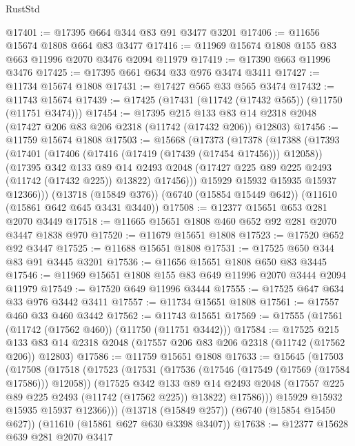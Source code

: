 \begin{lexlean}{RustStd}
\begin{coremodule}
@17401 := @17395 @664 @344 @83 @91 @3477 @3201
@17406 := @11656 @15674 @1808 @664 @83 @3477
@17416 := @11969 @15674 @1808 @155 @83 @663 @11996 @2070 @3476 @2094 @11979
@17419 := @17390 @663 @11996 @3476
@17425 := @17395 @661 @634 @33 @976 @3474 @3411
@17427 := @11734 @15674 @1808
@17431 := @17427 @565 @33 @565 @3474
@17432 := @11743 @15674
@17439 := @17425 (@17431 (@11742 (@17432 @565)) (@11750 (@11751 @3474)))
@17454 := @17395
    @215
    @133
    @83
    @14
    @2318
    @2048
    (@17427 @206 @83 @206 @2318 (@11742 (@17432 @206)) @12803)
@17456 := @11759 @15674 @1808
@17503 := @15668
    (@17373
      (@17378
        (@17388
          (@17393
            (@17401
              (@17406 (@17416 (@17419 (@17439 (@17454 @17456))) @12058))
              (@17395
                @342
                @133
                @89
                @14
                @2493
                @2048
                (@17427 @225 @89 @225 @2493 (@11742 (@17432 @225)) @13822)
                @17456)))
          @15929
          @15932
          @15935
          @15937
          @12366)))
    (@13718 (@15849 @376))
    (@6740 (@15854 @15449 @642))
    (@11610 (@15861 @642 @645 @3431 @3440))
@17508 := @12377 @15651 @653 @281 @2070 @3449
@17518 := @11665 @15651 @1808 @460 @652 @92 @281 @2070 @3447 @1838 @970
@17520 := @11679 @15651 @1808
@17523 := @17520 @652 @92 @3447
@17525 := @11688 @15651 @1808
@17531 := @17525 @650 @344 @83 @91 @3445 @3201
@17536 := @11656 @15651 @1808 @650 @83 @3445
@17546 := @11969 @15651 @1808 @155 @83 @649 @11996 @2070 @3444 @2094 @11979
@17549 := @17520 @649 @11996 @3444
@17555 := @17525 @647 @634 @33 @976 @3442 @3411
@17557 := @11734 @15651 @1808
@17561 := @17557 @460 @33 @460 @3442
@17562 := @11743 @15651
@17569 := @17555 (@17561 (@11742 (@17562 @460)) (@11750 (@11751 @3442)))
@17584 := @17525
    @215
    @133
    @83
    @14
    @2318
    @2048
    (@17557 @206 @83 @206 @2318 (@11742 (@17562 @206)) @12803)
@17586 := @11759 @15651 @1808
@17633 := @15645
    (@17503
      (@17508
        (@17518
          (@17523
            (@17531
              (@17536 (@17546 (@17549 (@17569 (@17584 @17586))) @12058))
              (@17525
                @342
                @133
                @89
                @14
                @2493
                @2048
                (@17557 @225 @89 @225 @2493 (@11742 (@17562 @225)) @13822)
                @17586)))
          @15929
          @15932
          @15935
          @15937
          @12366)))
    (@13718 (@15849 @257))
    (@6740 (@15854 @15450 @627))
    (@11610 (@15861 @627 @630 @3398 @3407))
@17638 := @12377 @15628 @639 @281 @2070 @3417

\end{coremodule}
\end{lexlean}
